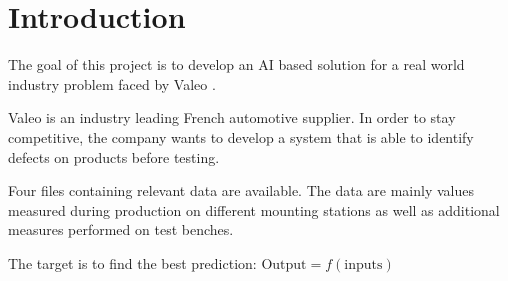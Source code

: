 \section{Introduction}
The goal of this project is to develop an AI based solution for a real world industry problem faced by Valeo \cite{project}.

Valeo \cite{valeo} is an industry leading French automotive supplier. In order to stay competitive, the company wants to develop a system that is able to identify defects on products before testing.

Four files containing relevant data are available. The data are mainly values measured during production on different mounting stations as well as additional measures performed on test benches.

The target is to find the best prediction: \(\text{Output} = f (\text{inputs})\)